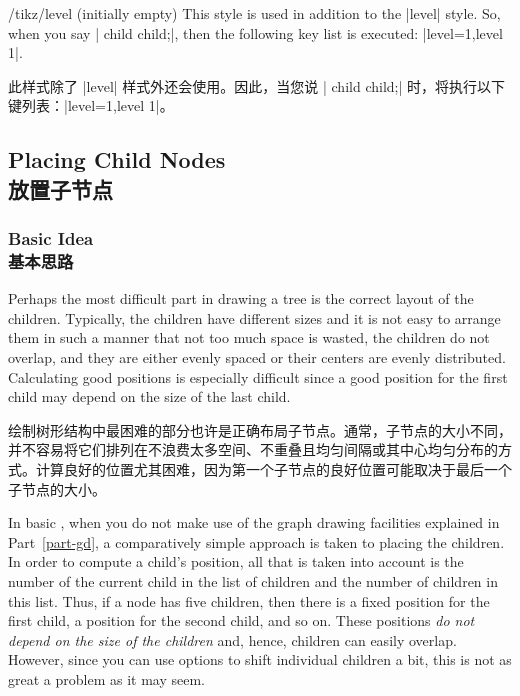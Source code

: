 \begin{stylekey}{/tikz/level  (initially \normalfont empty)}
    This style is used in addition to the |level| style. So, when you say
    | child child;|, then the following key list is executed:
    |level=1,level 1|.
    
    此样式除了 |level| 样式外还会使用。因此，当您说 | child child;| 时，将执行以下键列表：|level=1,level 1|。

    \begin{codeexample}[]
\end{codeexample}
    
\end{stylekey}


\subsection{Placing Child Nodes\\放置子节点}
\label{section-tree-placement}

\subsubsection{Basic Idea\\基本思路}

Perhaps the most difficult part in drawing a tree is the correct layout of the
children. Typically, the children have different sizes and it is not easy to
arrange them in such a manner that not too much space is wasted, the children
do not overlap, and they are either evenly spaced or their centers are evenly
distributed. Calculating good positions is especially difficult since a good
position for the first child may depend on the size of the last child.

绘制树形结构中最困难的部分也许是正确布局子节点。通常，子节点的大小不同，并不容易将它们排列在不浪费太多空间、不重叠且均匀间隔或其中心均匀分布的方式。计算良好的位置尤其困难，因为第一个子节点的良好位置可能取决于最后一个子节点的大小。

In basic \tikzname, when you do not make use of the graph drawing facilities
explained in Part~\ref{part-gd}, a comparatively simple approach is taken to
placing the children. In order to compute a child's position, all that is taken
into account is the number of the current child in the list of children and the
number of children in this list. Thus, if a node has five children, then there
is a fixed position for the first child, a position for the second child, and
so on. These positions \emph{do not depend on the size of the children} and,
hence, children can easily overlap. However, since you can use options to shift
individual children a bit, this is not as great a problem as it may seem.

